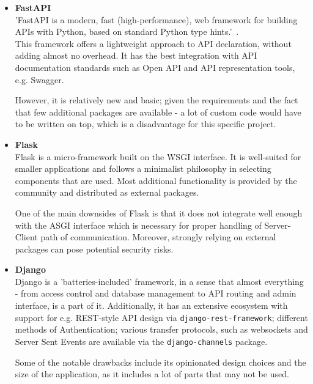 \begin{itemize}
    \item \textbf{FastAPI} \\
    'FastAPI is a modern, fast (high-performance), web framework for building APIs
    with Python, based on standard Python type hints.'~\cite{fastapi}. \\
    This framework offers a lightweight approach to API declaration, without adding almost no overhead.
    It has the best integration with API documentation standards such as
    Open API and API representation tools, e.g. Swagger.

    However, it is relatively new and basic; given the requirements and the fact that
    few additional packages are available - a lot of custom code would have
    to be written on top, which is a disadvantage for this specific project.

    \item \textbf{Flask} \\
    Flask is a micro-framework built on the WSGI interface.
    It is well-suited for smaller applications and follows a minimalist philosophy
    in selecting components that are used.\cite{flask} Most additional functionality is provided by
    the community and distributed as external packages.

    One of the main downsides of Flask is that it does not integrate well enough with the ASGI
    interface which is necessary for proper handling of Server-Client path of communication.
    Moreover, strongly relying on external packages can pose potential security risks.

    \item \textbf{Django} \\
    Django is a 'batteries-included' framework, in a sense that almost everything -
    from access control and database management to API routing and admin interface,
    is a part of it.\cite{django} Additionally, it has an extensive ecosystem with support for e.g. REST-style API
    design via \texttt{django-rest-framework}\cite{drf}; different methods of Authentication;
    various transfer protocols, such as websockets and Server Sent Events are available
    via the \texttt{django-channels}\cite{django_channels} package.

    Some of the notable drawbacks include its opinionated design choices and the size of the application,
    as it includes a lot of parts that may not be used.
\end{itemize}

